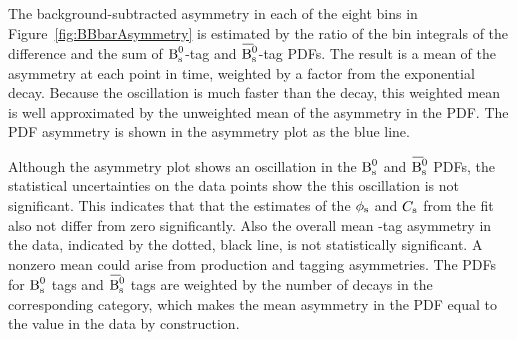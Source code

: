 The background-subtracted asymmetry in each of the eight bins in Figure~\ref{fig:BBbarAsymmetry} is estimated by the ratio of the bin
integrals of the difference and the sum of $\text{B}_\text{s}^\text{0}$-tag and $\Bsbar$-tag PDFs. The result is a mean of the asymmetry at each point in time,
weighted by a factor from the exponential decay. Because the oscillation is much faster than the decay, this weighted mean is well
approximated by the unweighted mean of the asymmetry in the PDF. The PDF asymmetry is shown in the asymmetry plot as the blue line.

Although the asymmetry plot shows an oscillation in the $\text{B}_\text{s}^\text{0}$ and $\Bsbar$ PDFs, the statistical uncertainties on the data points show the
this oscillation is not significant. This indicates that that the estimates of the $\phi_\text{s}$ and $C_\text{s}$ from the fit also not differ from zero
significantly. Also the overall mean \BsBsbar-tag asymmetry in the data, indicated by the dotted, black line, is not statistically
significant. A nonzero mean could arise from production and tagging asymmetries. The PDFs for $\text{B}_\text{s}^\text{0}$ tags and $\Bsbar$ tags are weighted by
the number of decays in the corresponding category, which makes the mean asymmetry in the PDF equal to the value in the data by
construction.
